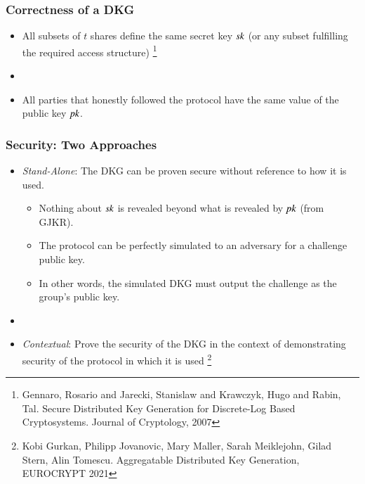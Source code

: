 \documentclass[hyperref={pdfpagelabels=true},table,dvipsnames,14pt,aspectratio=169]{beamer}
\begin{document}
\begin{frame}
  \frametitle{Correctness of a DKG}

  \begin{itemize}
    \item<1-> All subsets of $t$ shares define the same secret key $\mathit{sk}$ (or any subset fulfilling the required access structure)
\let\thefootnote\relax\footnote{
Gennaro, Rosario and Jarecki, Stanislaw and Krawczyk, Hugo and Rabin, Tal. Secure Distributed Key Generation for Discrete-Log Based Cryptosystems. Journal of Cryptology, 2007
}
    \item[]
    \item<2-> All parties that honestly followed the protocol have the same value of the public key $\mathit{pk}$.
  \end{itemize}
\end{frame}

\begin{frame}
  \frametitle{Security: Two Approaches}

  \begin{itemize}
    \item<1-> \emph{Stand-Alone}: The DKG can be proven secure without reference to how it is used.
    \begin{itemize}
      \item<2-> Nothing about $\mathit{sk}$ is revealed beyond what is revealed by $\mathit{pk}$ (from GJKR).
      \item<3-> The protocol can be perfectly simulated to an adversary for a challenge public key.
      \item<4-> In other words, the simulated DKG must output the challenge as the group's public key.
    \end{itemize}

    \item[]
    \item<5-> \emph{Contextual}: Prove the security of the DKG in the context of demonstrating security of the protocol in which it is used
  \footnote{
  Kobi Gurkan, Philipp Jovanovic, Mary Maller, Sarah Meiklejohn, Gilad Stern, Alin Tomescu.
  Aggregatable Distributed Key Generation, EUROCRYPT 2021 }
  \end{itemize}
\end{frame}
\end{document}
